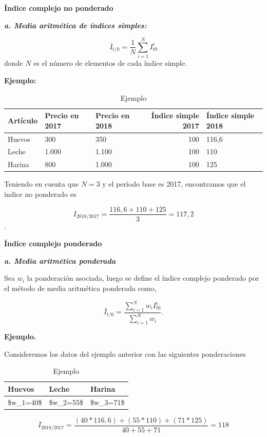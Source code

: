 \documentclass[
  11pt,
]{book}
\begin{document}
\textbf{Índice complejo no ponderado}

\textbf{\emph{a. Media aritmética de índices simples:}}

\[ \overline{I}_{t/0}=\frac{1}{N}\sum^{N}_{i=1}I_{t0}^{i} \]
donde \(N\) es el número de elementos de cada índice simple.

\textbf{Ejemplo:}

\begin{table}

\caption{\label{tab:unnamed-chunk-7}Ejemplo}
\centering
\begin{tabular}[t]{l|l|l|r|l}
\hline
Artículo & Precio en 2017 & Precio en 2018 & Índice simple 2017 & Índice simple 2018\\
\hline
Huevos & 300 & 350 & 100 & 116,6\\
\hline
Leche & 1.000 & 1.100 & 100 & 110\\
\hline
Harina & 800 & 1.000 & 100 & 125\\
\hline
\end{tabular}
\end{table}

Teniendo en cuenta que \(N=3\) y el período base es 2017, encontramos que el índice no ponderado es

\[ I_{2018/2017}=\frac{116,6+110+125}{3}=117,2\].

\textbf{Índice complejo ponderado }

\textbf{\emph{a. Media aritmética ponderada}}

Sea \(w_i\) la ponderación asociada, luego se define el índice complejo ponderado por el método de media aritmética ponderada como,

\[ \overline{I}_{t/0}=\frac{\sum^{N}_{i=1}w_iI_{t0}^{i}}{\sum^{N}_{i=1}w_i}. \]

\textbf{Ejemplo.}

Consideremos los datos del ejemplo anterior con las siguientes ponderaciones

\begin{table}

\caption{\label{tab:unnamed-chunk-8}Ejemplo}
\centering
\begin{tabular}[t]{l|l|l}
\hline
Huevos & Leche & Harina\\
\hline
\$w\_1=40\$ & \$w\_2=55\$ & \$w\_3=71\$\\
\hline
\end{tabular}
\end{table}

\[\overline{I}_{2018/2017}=\frac{(40*116,6)+(55*110)+(71*125)}{40+55+71}=118\]
\end{document}
